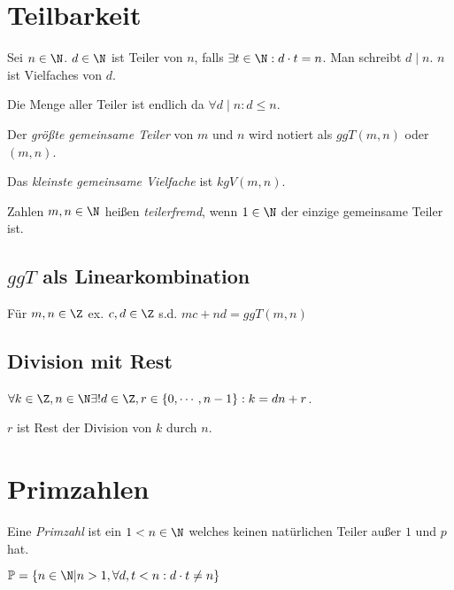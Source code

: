 \newcommand{\Primes}{\mathbb{P}}

\section*{Teilbarkeit}

Sei $n \in \N$. $d \in \N$ ist Teiler von $n$, falls $\exists t \in \N : d \cdot t = n$. Man schreibt $d \mid n$. $n$ ist Vielfaches von $d$.

\vspace*{1mm}

Die Menge aller Teiler ist endlich da $\forall d \mid n : d \leq n$.

\vspace*{1mm}

Der \emph{größte gemeinsame Teiler} von $m$ und $n$ wird notiert als $ggT(m,n)$ oder $(m,n)$.

\vspace*{1mm}

Das \emph{kleinste gemeinsame Vielfache} ist $kgV(m,n)$.

\vspace*{1mm}

Zahlen $m, n \in \N$ heißen \emph{teilerfremd}, wenn $1 \in \N$ der einzige gemeinsame Teiler ist.

\subsection*{$ggT$ als Linearkombination}

Für $m, n \in \Z$ ex. $c, d \in \Z$ s.d. $mc + nd = ggT(m,n)$

\subsection*{Division mit Rest}

$\forall k \in \Z, n \in \N \exists! d \in \Z, r \in \{0,\cdots,n-1\}: k = dn+r$.

$r$ ist Rest der Division von $k$ durch $n$.

\section*{Primzahlen}

Eine \emph{Primzahl} ist ein $1 < n \in \N$ welches keinen natürlichen Teiler außer $1$ und $p$ hat.

$\Primes = \{ n \in \N | n > 1, \forall d,t < n : d \cdot t \neq n \}$


